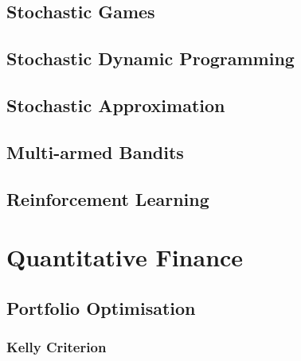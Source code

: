 \documentclass[11pt]{report} %
\begin{document}
\section{Stochastic Games}

\section{Stochastic Dynamic Programming}

\section{Stochastic Approximation}

\section{Multi-armed Bandits}

\section{Reinforcement Learning}

\chapter{Quantitative Finance}

\section{Portfolio Optimisation}

\subsection{Kelly Criterion}
\end{document}

